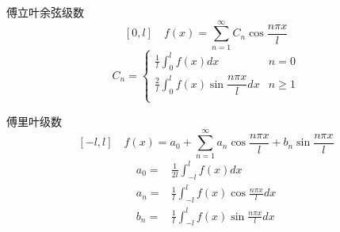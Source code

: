 傅立叶余弦级数
$$[0,l]\quad f(x)=\sum_{n=1}^\infty C_n\cos{\frac{n\pi x}{l}}$$
$$C_n=\left\{
\begin{array}{lc}
\frac{1}{l}\int_0^lf(x)dx &n=0\\
\frac{2}{l}\int_0^lf(x)\sin\dfrac{n\pi x}{l}dx &n\ge1\\
\end{array}
\right.$$

傅里叶级数
$$[-l,l]\quad f(x)=a_0+\sum_{n=1}^\infty a_n\cos{\frac{n\pi x}{l}}+b_n\sin{\frac{n\pi x}{l}}$$
$$\begin{aligned}
    a_0=&\frac{1}{2l}\int_{-l}^lf(x)dx\\
    a_n=&\frac{1}{l}\int_{-l}^lf(x)\cos\frac{n\pi x}{l}dx\\
    b_n=&\frac{1}{l}\int_{-l}^lf(x)\sin\frac{n\pi x}{l}dx\\
\end{aligned}$$